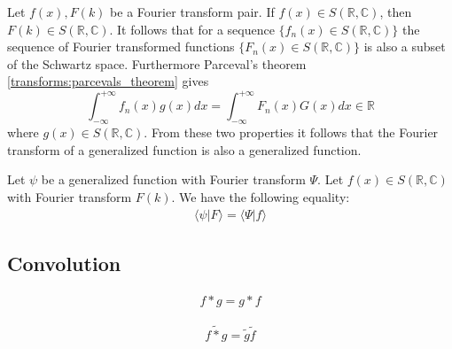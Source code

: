 	\begin{theorem}
		Let $f(x), F(k)$ be a Fourier transform pair. If $f(x)\in S(\mathbb{R},\mathbb{C})$, then $F(k)\in S(\mathbb{R},\mathbb{C})$. It follows that for a sequence $\{f_n(x)\in S(\mathbb{R},\mathbb{C})\}$ the sequence of Fourier transformed functions $\{F_n(x)\in S(\mathbb{R},\mathbb{C})\}$ is also a subset of the Schwartz space. Furthermore Parceval's theorem \ref{transforms:parcevals_theorem} gives \[\int_{-\infty}^{+\infty}f_n(x)g(x)dx = \int_{-\infty}^{+\infty}F_n(x)G(x)dx\in\mathbb{R}\] where $g(x)\in S(\mathbb{R},\mathbb{C})$. From these two properties it follows that the Fourier transform of a generalized function is also a generalized function.
	\end{theorem}
    
	\begin{property}
		Let $\psi$ be a generalized function with Fourier transform $\Psi$. Let $f(x)\in S(\mathbb{R},\mathbb{C})$ with Fourier transform $F(k)$. We have the following equality:
        \begin{gather}
			\langle \psi|F \rangle = \langle \Psi|f \rangle
		\end{gather}
	\end{property}

\subsection{Convolution}

        
        \begin{property}[Commutativity]
		\begin{gather}
			f \ast g = g \ast f
	        \end{gather}
	\end{property}
        
        \begin{theorem}
		\begin{gather}
			\widetilde{f \ast g} = \widetilde{g} \widetilde{f}
	        \end{gather}
	\end{theorem}

